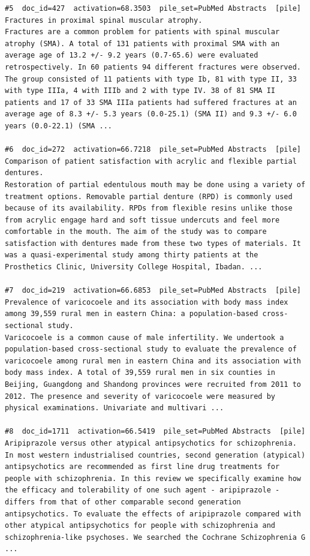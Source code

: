 \begin{verbatim}
#5  doc_id=427  activation=68.3503  pile_set=PubMed Abstracts  [pile]
Fractures in proximal spinal muscular atrophy.
Fractures are a common problem for patients with spinal muscular atrophy (SMA). A total of 131 patients with proximal SMA with an average age of 13.2 +/- 9.2 years (0.7-65.6) were evaluated retrospectively. In 60 patients 94 different fractures were observed. The group consisted of 11 patients with type Ib, 81 with type II, 33 with type IIIa, 4 with IIIb and 2 with type IV. 38 of 81 SMA II patients and 17 of 33 SMA IIIa patients had suffered fractures at an average age of 8.3 +/- 5.3 years (0.0-25.1) (SMA II) and 9.3 +/- 6.0 years (0.0-22.1) (SMA ...

#6  doc_id=272  activation=66.7218  pile_set=PubMed Abstracts  [pile]
Comparison of patient satisfaction with acrylic and flexible partial dentures.
Restoration of partial edentulous mouth may be done using a variety of treatment options. Removable partial denture (RPD) is commonly used because of its availability. RPDs from flexible resins unlike those from acrylic engage hard and soft tissue undercuts and feel more comfortable in the mouth. The aim of the study was to compare satisfaction with dentures made from these two types of materials. It was a quasi-experimental study among thirty patients at the Prosthetics Clinic, University College Hospital, Ibadan. ...

#7  doc_id=219  activation=66.6853  pile_set=PubMed Abstracts  [pile]
Prevalence of varicocoele and its association with body mass index among 39,559 rural men in eastern China: a population-based cross-sectional study.
Varicocoele is a common cause of male infertility. We undertook a population-based cross-sectional study to evaluate the prevalence of varicocoele among rural men in eastern China and its association with body mass index. A total of 39,559 rural men in six counties in Beijing, Guangdong and Shandong provinces were recruited from 2011 to 2012. The presence and severity of varicocoele were measured by physical examinations. Univariate and multivari ...

#8  doc_id=1711  activation=66.5419  pile_set=PubMed Abstracts  [pile]
Aripiprazole versus other atypical antipsychotics for schizophrenia.
In most western industrialised countries, second generation (atypical) antipsychotics are recommended as first line drug treatments for people with schizophrenia. In this review we specifically examine how the efficacy and tolerability of one such agent - aripiprazole - differs from that of other comparable second generation antipsychotics. To evaluate the effects of aripiprazole compared with other atypical antipsychotics for people with schizophrenia and schizophrenia-like psychoses. We searched the Cochrane Schizophrenia G ...


\end{verbatim}
